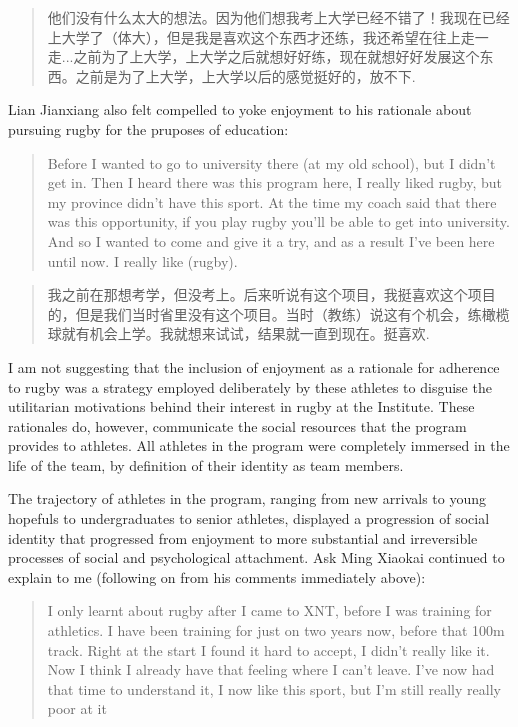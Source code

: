 \begin{CJK}{UTF8}{gbsn}
    \begin{quotation}
      他们没有什么太大的想法。因为他们想我考上大学已经不错了！我现在已经上大学了（体大），但是我是喜欢这个东西才还练，我还希望在往上走一走...之前为了上大学，上大学之后就想好好练，现在就想好好发展这个东西。之前是为了上大学，上大学以后的感觉挺好的，放不下.
    \end{quotation}

Lian Jianxiang also felt compelled to yoke enjoyment to his rationale about pursuing rugby for the pruposes of education:

    \begin{quotation}
        Before I wanted to go to university there (at my old school), but I didn't get in.  Then I heard there was this program here, I really liked rugby, but my province didn't have this sport. At the time my coach said that there was this opportunity, if you play rugby you'll be able to get into university.  And so I wanted to come and give it a try, and as a result I've been here until now.  I really like (rugby).
    \end{quotation}

    \begin{quotation}
        我之前在那想考学，但没考上。后来听说有这个项目，我挺喜欢这个项目的，但是我们当时省里没有这个项目。当时（教练）说这有个机会，练橄榄球就有机会上学。我就想来试试，结果就一直到现在。挺喜欢.
    \end{quotation}

I am not suggesting that the inclusion of enjoyment as a rationale for adherence to rugby was a strategy employed deliberately by these athletes to disguise the utilitarian motivations behind their interest in rugby at the Institute.  These rationales do, however,  communicate the social resources that the program provides to athletes.  All athletes in the program were completely immersed in the life of the team, by definition of their identity as team members.

The trajectory of athletes in the program, ranging from new arrivals to young hopefuls to undergraduates to senior athletes, displayed a progression of social identity that progressed from enjoyment to more substantial and irreversible processes of social and psychological attachment.  Ask Ming Xiaokai continued to explain to me (following on from his comments immediately above):

\begin{quotation}
    I only learnt about rugby after I came to XNT, before I was training for athletics. I have been training for just on two years now, before that 100m track.  Right at the start I found it hard to accept, I didn’t really like it. Now I think I already have that feeling where I can’t leave.  I’ve now had that time to understand it, I now like this sport, but I’m still really really poor at it
\end{quotation}


\end{CJK}
